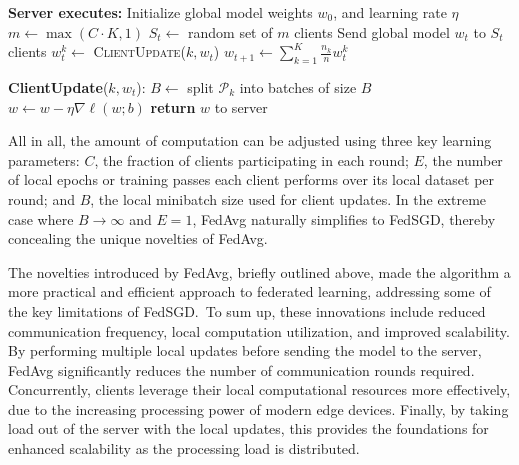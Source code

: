 \begin{algorithm}[H]
    \caption{FederatedAveraging}
    \label{alg:fedavg}
    \begin{algorithmic}[1]
        \State \textbf{Server executes:}
        \State Initialize global model weights $w_0$, and learning rate $\eta$
        \State $m \gets \max(C \cdot K, 1)$
        \State $S_t \gets$ random set of $m$ clients
        \State Send global model $w_t$ to $S_t$ clients
        \State $w_t^k \gets$ \textsc{ClientUpdate}($k, w_t$)
        \EndFor
        \State $w_{t+1} \gets \sum_{k=1}^K \frac{n_k}{n} w_t^k$
        \EndFor

        \vspace{1em}
        \State \textbf{ClientUpdate}($k, w_t$):
        \State $B \gets$ split $\mathcal{P}_k$ into batches of size $B$
        \State $w \gets w - \eta \nabla \ell(w; b)$
        \EndFor
        \EndFor
        \State \textbf{return} $w$ to server
    \end{algorithmic}
\end{algorithm}

All in all, the amount of computation can be adjusted using three key learning parameters: \emph{$C$}, the fraction of clients participating
in each round; \emph{$E$}, the number of local epochs or training passes each client performs over its local dataset per round; and \emph{$B$},
the local minibatch size used for client updates. In the extreme case where $B \rightarrow \infty$ and $E = 1$, FedAvg naturally simplifies to
FedSGD, thereby concealing the unique novelties of FedAvg.


The novelties introduced by FedAvg, briefly outlined above, made the algorithm a more practical and efficient approach to federated learning,
addressing some of the key limitations of FedSGD.\ To sum up, these innovations include reduced communication frequency, local computation
utilization, and improved scalability. By performing multiple local updates before sending the model to the server, FedAvg significantly
reduces the number of communication rounds required. Concurrently, clients leverage their local computational resources more effectively,
due to the increasing processing power of modern edge devices. Finally, by taking load out of the server with the local updates, this
provides the foundations for enhanced scalability as the processing load is distributed.

